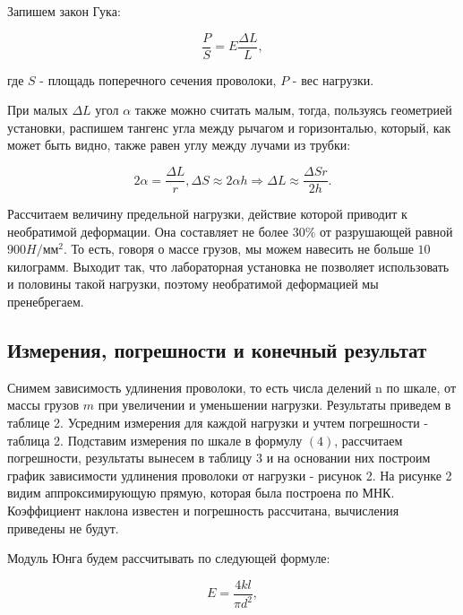 \documentclass[a4paper,12pt]{report}
\begin{document}
Запишем закон Гука:

\begin{equation}
	\frac{P}{S}=E\frac{\Delta L}{L},
	\label{form2}
\end{equation}

где $S$ - площадь поперечного сечения проволоки, $P$ - вес нагрузки.

При малых $\Delta L$ угол $\alpha$ также можно считать малым, тогда, пользуясь геометрией установки, распишем тангенс угла между рычагом и горизонталью, который, как может быть видно, также равен углу между лучами из трубки:

\begin{equation}
	2 \alpha = \frac{\Delta L}{r} , \Delta S \approx 2 \alpha h \Rightarrow \Delta L \approx \frac{\Delta S r}{2 h}.
	\label{form3}
\end{equation}

Рассчитаем величину предельной нагрузки, действие которой приводит к необратимой деформации. Она составляет не более $30\%$ от разрушающей равной $900 H/$мм$^2$. То есть, говоря о массе грузов, мы можем навесить не больше $10$ килограмм. Выходит так, что лабораторная установка не позволяет использовать и половины такой нагрузки, поэтому необратимой деформацией мы пренебрегаем.
 


\subsection*{Измерения, погрешности и конечный результат}



Снимем зависимость удлинения проволоки, то есть числа делений n по шкале, от массы грузов $m$ при увеличении и уменьшении нагрузки. Результаты приведем в таблице 2. Усредним измерения для каждой нагрузки и учтем погрешности - таблица 2. Подставим измерения по шкале в формулу $(4)$, рассчитаем погрешности, результаты вынесем в таблицу 3 и на основании них построим график зависимости удлинения проволоки от нагрузки - рисунок 2. На рисунке 2 видим аппроксимирующую прямую, которая была построена по МНК. Коэффициент наклона известен и погрешность рассчитана, вычисления приведены не будут. 

Модуль Юнга будем рассчитывать по следующей формуле:

\begin{equation}
	E = \frac{4kl}{\pi d^2},
	\label{Eodnoos}
\end{equation}
\end{document}
